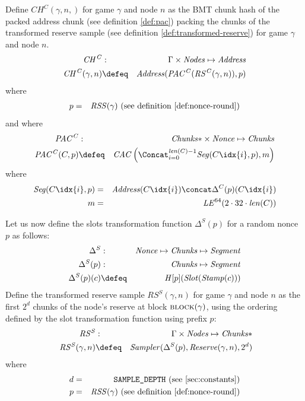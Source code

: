 \begin{definition}
\label{def:chc}
Define $\mathit{CH^C}(\gamma,n,)$ for game $\gamma$ and node $n$ as the BMT chunk hash of the packed address chunk (see definition \ref{def:pac}) packing the chunks of the transformed reserve sample (see definition \ref{def:transformed-reserve}) for game $\gamma$ and node $n$.
%
\begin{eqnarray}
\mathit{CH^C}&:&\Gamma\times\mathit{Nodes}\mapsto\mathit{Address}\\
\mathit{CH^C}(\gamma,n)&\defeq&\mathit{Address}(\mathit{PAC^C}(\mathit{RS^C}(\gamma, n)), p)
    \end{eqnarray}
where
\begin{eqnarray}
p & = & \mathit{RSS}(\gamma) \text{ (see definition \ref{def:nonce-round})}
\end{eqnarray}
and where 
\begin{eqnarray}
\mathit{PAC^C}&:&\mathit{Chunks}{*}\times\mathit{Nonce}\mapsto\mathit{Chunks}\\
\mathit{PAC^C}(C,p)&\defeq&\mathit{CAC}{}\left(\Concat_{i=0}^{\mathit{len}(C)-1} \mathit{Seg}(C\idx{i},p), m\right)
\end{eqnarray}
where
\begin{eqnarray}
\mathit{Seg}(C\idx{i},p) &=& \mathit{Address}(C\idx{i})\concat \Delta^C(p)(C\idx{i}) \\
m & = & \mathit{LE}^{64}(2\cdot32\cdot\mathit{len}(C))
\end{eqnarray}
\end{definition}

\begin{definition}
\label{def:transformed-slots}
%
Let us now define the slots transformation function $\Delta^S(p)$
for a random nonce $p$ as follows: 
%
\begin{eqnarray}
\Delta^S&:&\mathit{Nonce}\mapsto\mathit{Chunks}\mapsto\mathit{Segment}\\
\Delta^S(p)&:&\mathit{Chunks}\mapsto\mathit{Segment}\\
\Delta^S(p)(c)&\defeq&\mathit{H}[p](\mathit{Slot}(\mathit{Stamp}(c)))
\end{eqnarray}
%
Define the transformed reserve sample $\mathit{RS^S}(\gamma,n)$ for game $\gamma$ and node $n$ as the first $2^d$ chunks  of the node's reserve at block $\textsc{block}(\gamma)$, using the ordering defined by the slot transformation function using prefix $p$:%
\begin{eqnarray}
\mathit{RS^S}&:&\Gamma\times\mathit{Nodes}\mapsto\mathit{Chunks}{*}\\\
\mathit{RS^S}(\gamma,n)&\defeq&\mathit{Sampler}(\Delta^S(p),\mathit{Reserve}(\gamma,n),2^d)
\end{eqnarray}
where 
\begin{eqnarray}
d & = & \texttt{SAMPLE\_DEPTH} \text{ (see \ref{sec:constants})} \\
p & = & \mathit{RSS}(\gamma) \text{ (see definition \ref{def:nonce-round})}
\end{eqnarray}
\end{definition}


